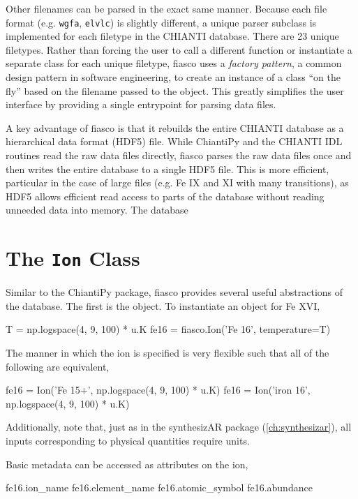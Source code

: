 Other filenames can be parsed in the exact same manner. Because each file format (e.g. \texttt{wgfa}, \texttt{elvlc}) is slightly different, a unique parser subclass is implemented for each filetype in the CHIANTI database. There are 23 unique filetypes. Rather than forcing the user to call a different function or instantiate a separate class for each unique filetype, fiasco uses a \textit{factory pattern}, a common design pattern in software engineering, to create an instance of a class ``on the fly'' based on the filename passed to the  object. This greatly simplifies the user interface by providing a single entrypoint for parsing data files.

A key advantage of fiasco is that it rebuilds the entire CHIANTI database as a hierarchical data format (HDF5) file. While ChiantiPy and the CHIANTI IDL routines read the raw data files directly, fiasco parses the raw data files once and then writes the entire database to a single HDF5 file. This is more efficient, particular in the case of large files (e.g. Fe IX and XI with many transitions), as HDF5 allows efficient read access to parts of the database without reading unneeded data into memory. The database 

\section{The \texttt{Ion} Class}\label{sec:fiasco-ion}

Similar to the ChiantiPy package, fiasco provides several useful abstractions of the database. The first is the  object. To instantiate an  object for Fe XVI,
\begin{pyblock}[appendix1][baselinestretch=1,xleftmargin=3em]
T = np.logspace(4, 9, 100) * u.K
fe16 = fiasco.Ion('Fe 16', temperature=T)
\end{pyblock}
The manner in which the ion is specified is very flexible such that all of the following are equivalent,
\begin{pyblock}[appendix1][baselinestretch=1,xleftmargin=3em]
fe16 = Ion('Fe 15+', np.logspace(4, 9, 100) * u.K)
fe16 = Ion('iron 16', np.logspace(4, 9, 100) * u.K)
\end{pyblock}
Additionally, note that, just as in the synthesizAR package (\autoref{ch:synthesizar}), all inputs corresponding to physical quantities require units.

Basic metadata can be accessed as attributes on the ion,
\begin{pyblock}[appendix1][baselinestretch=1,xleftmargin=3em]
fe16.ion_name
fe16.element_name
fe16.atomic_symbol
fe16.abundance
\end{pyblock}

